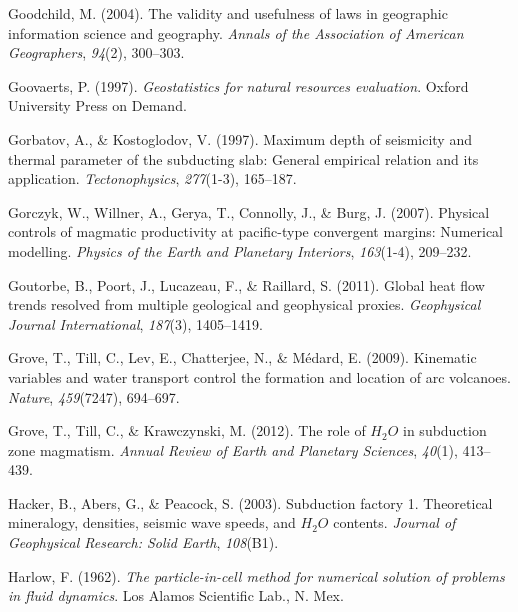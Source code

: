 \begin{CSLReferences}{1}{1}
\leavevmode{}%
Goodchild, M. (2004). The validity and usefulness of laws in geographic information science and geography. \emph{Annals of the Association of American Geographers}, \emph{94}(2), 300--303.

\leavevmode{}%
Goovaerts, P. (1997). \emph{Geostatistics for natural resources evaluation}. Oxford University Press on Demand.

\leavevmode{}%
Gorbatov, A., \& Kostoglodov, V. (1997). Maximum depth of seismicity and thermal parameter of the subducting slab: General empirical relation and its application. \emph{Tectonophysics}, \emph{277}(1-3), 165--187.

\leavevmode{}%
Gorczyk, W., Willner, A., Gerya, T., Connolly, J., \& Burg, J. (2007). Physical controls of magmatic productivity at pacific-type convergent margins: Numerical modelling. \emph{Physics of the Earth and Planetary Interiors}, \emph{163}(1-4), 209--232.

\leavevmode{}%
Goutorbe, B., Poort, J., Lucazeau, F., \& Raillard, S. (2011). Global heat flow trends resolved from multiple geological and geophysical proxies. \emph{Geophysical Journal International}, \emph{187}(3), 1405--1419.

\leavevmode{}%
Grove, T., Till, C., Lev, E., Chatterjee, N., \& Médard, E. (2009). Kinematic variables and water transport control the formation and location of arc volcanoes. \emph{Nature}, \emph{459}(7247), 694--697.

\leavevmode{}%
Grove, T., Till, C., \& Krawczynski, M. (2012). The role of \(H_2O\) in subduction zone magmatism. \emph{Annual Review of Earth and Planetary Sciences}, \emph{40}(1), 413--439.

\leavevmode{}%
Hacker, B., Abers, G., \& Peacock, S. (2003). Subduction factory 1. Theoretical mineralogy, densities, seismic wave speeds, and \(H_2O\) contents. \emph{Journal of Geophysical Research: Solid Earth}, \emph{108}(B1).

\leavevmode{}%
Harlow, F. (1962). \emph{The particle-in-cell method for numerical solution of problems in fluid dynamics}. Los Alamos Scientific Lab., N. Mex.


\end{CSLReferences}
